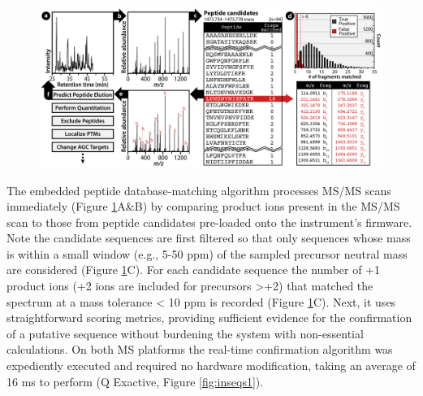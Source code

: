 \begin{figure}
	\centering
	\includegraphics[width=\columnwidth]{inseq/inSeq_Fig 1.png}
	\label{fig:inseq1}
\end{figure} 
The embedded peptide database-matching algorithm processes MS/MS scans immediately (Figure \ref{fig:inseq1}A\&B) by comparing product ions present in the MS/MS scan to those from peptide candidates pre-loaded onto the instrument's firmware. Note the candidate sequences are first filtered so that only sequences whose mass is within a small window (e.g., 5-50 ppm) of the sampled precursor neutral mass are considered (Figure \ref{fig:inseq1}C). For each candidate sequence the number of +1 product ions (+2 ions are included for precursors >+2) that matched the spectrum at a mass tolerance < 10 ppm is recorded (Figure \ref{fig:inseq1}C). Next, it uses straightforward scoring metrics, providing sufficient evidence for the confirmation of a putative sequence without burdening the system with non-essential calculations. On both MS platforms the real-time confirmation algorithm was expediently executed and required no hardware modification, taking an average of 16 ms to perform (Q Exactive, Figure \ref{fig:inseqs1}).
